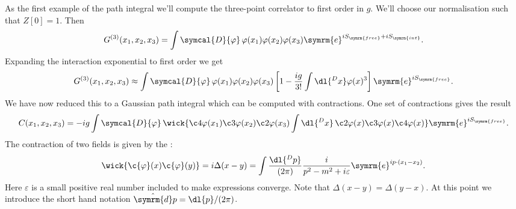 \documentclass[fleqn]{NotesClass}
\newcommand{\e}{\symrm{e}}
\newcommand{\interaction}{{\symrm{int}}}
\newcommand{\DL}[1]{\symcal{D}{#1}}
\newcommand{\dhat}[1]{\hat{\symrm{d}}{#1}}
\begin{document}
    As the first example of the path integral we'll compute the three-point correlator to first order in \(g\).
    We'll choose our normalisation such that \(Z[0] = 1\).
    Then
    \begin{equation}
        G^{(3)}(x_1, x_2, x_3) = \int \DL{\varphi} \, \varphi(x_1) \varphi(x_2) \varphi(x_3) \e^{iS_{\symrm{free}} + iS_{\interaction}}.
    \end{equation}
    Expanding the interaction exponential to first order we get
    \begin{equation}
        G^{(3)}(x_1, x_2, x_3) \approx \int \DL{\varphi} \, \varphi(x_1) \varphi(x_2) \varphi(x_3) \left[ 1 - \frac{ig}{3!} \int \dl{^Dx} \varphi(x)^3 \right] \e^{iS_{\symrm{free}}}.
    \end{equation}
    We have now reduced this to a Gaussian path integral which can be computed with contractions.
    One set of contractions gives the result
    \begin{equation}
        C(x_1, x_2, x_3) = -ig \int \DL{\varphi} \, \wick{\c4{\varphi}(x_1) \c3{\varphi}(x_2) \c2{\varphi}(x_3) \int \dl{^Dx} \, \c2{\varphi}(x) \c3{\varphi}(x) \c4{\varphi}(x)} \e^{iS_{\symrm{free}}}.
    \end{equation}
    The contraction of two fields is given by the :
    \begin{equation}
        \wick{\c{\varphi}(x)\c{\varphi}(y)} = i\Delta(x - y) = \int \frac{\dl{^Dp}}{(2\pi)} \frac{i}{p^2 - m^2 + i\varepsilon} \e^{ip \cdot (x_1 - x_2)}.
    \end{equation}
    Here \(\varepsilon\) is a small positive real number included to make expressions converge.
    Note that \(\Delta(x - y) = \Delta(y - x)\).
    At this point we introduce the short hand notation \(\dhat{p} = \dl{p}/(2\pi)\).
    
\end{document}
